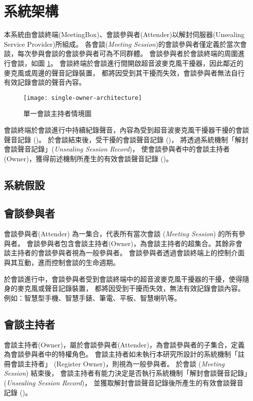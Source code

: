 \section{系統架構}

    本系統由會談終端(MeetingBox)、會談參與者(Attender)以解封伺服器(Unsealing Service Provider)所組成。
各會談({\it Meeting Session})的會談參與者僅定義於當次會談，每次參與會談的會談參與者可為不同群體。
會談參與者於會談終端的周圍進行會談，如圖 \ref{fig:s-o-arch}。
會談終端於會談進行間開啟超音波麥克風干擾器，因此鄰近的麥克風或周邊的聲音記錄裝置，
都將因受到其干擾而失效，會談參與者無法自行有效記錄會談的聲音內容。

\begin{figure}[H]
    \centering
    \texttt{[image: single-owner-architecture]}
    \caption{單一會談主持者情境圖}\label{fig:s-o-arch}
\end{figure}

    會談終端於會談進行中持續紀錄聲音，內容為受到超音波麥克風干擾器干擾的會談聲音記錄 (\DEFrecJ)。
於會談結束後，受干擾的會談聲音記錄 (\DEFrecJ)，
將透過系統機制「解封會談聲音記錄」({\it Unsealing Session Record})，
使會談參與者中的會談主持者(Owner)，獲得前述機制所產生的有效會談聲音記錄 (\DEFrecREV)。


\subsection{系統假設}


\subsection{會談參與者}

    會談參與者(Attender) 為一集合，代表所有當次會談 ({\it Meeting Session}) 的所有參與者。
會談參與者包含會談主持者(Owner)，為會談主持者的超集合。其餘非會談主持者的會談參與者視為一般參與者。
會談參與者透過會談終端上的控制介面與其互動，進而控制會談的生命週期。

    於會談進行中，會談參與者受到會談終端中的超音波麥克風干擾器的干擾，使得隨身的麥克風或聲音記錄裝置，
都將因受到干擾而失效，無法有效記錄會談內容。例如：智慧型手機、智慧手錶、筆電、平板、智慧喇叭等。


\subsection{會談主持者}

    會談主持者(Owner)，屬於會談參與者(Attender)，為會談參與者的子集合，定義為會談參與者中的特權角色。
會談主持者如未執行本研究所設計的系統機制「註冊會談主持者」 (Register Owner)，則視為一般參與者。
於會談 ({\it Meeting Session}) 結束後，
會談主持者有能力決定是否執行系統機制「解封會談聲音記錄」({\it Unsealing Session Record})，
並獲取解封會談聲音記錄後所產生的有效會談聲音記錄 (\DEFrecREV)。

